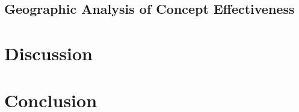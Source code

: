 \documentclass{article}
\begin{document}
\subsection{Geographic Analysis of Concept Effectiveness}



\section{Discussion}

\section{Conclusion}
\newpage



\newpage
\appendix







\end{document}
